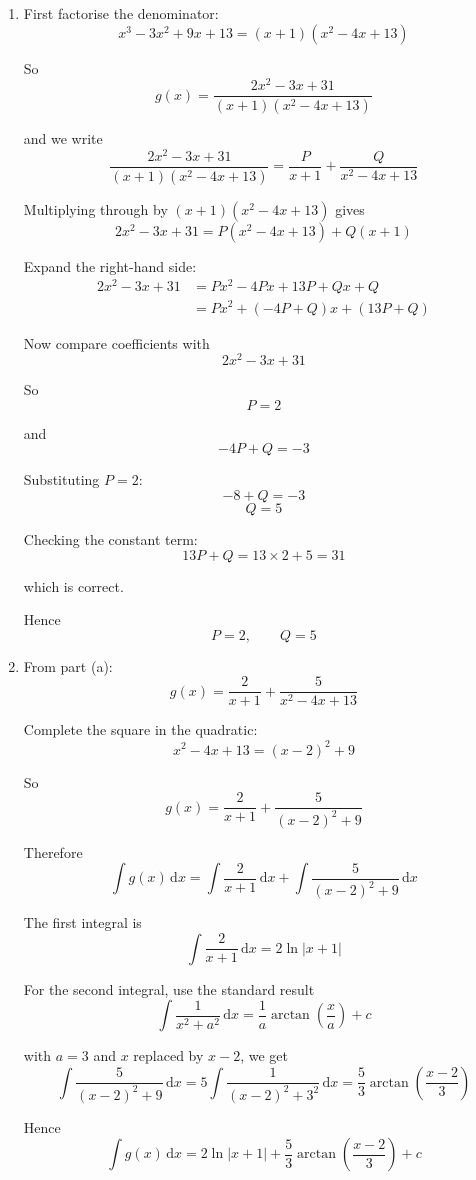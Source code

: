 \documentclass[leqno]{article}
\begin{document}
\begin{enumerate}[
  label=\textbf{\arabic*.},
  leftmargin=*,
  topsep=0pt,
  partopsep=0pt,
  parsep=0pt
]
\vspace*{10pt}

\begin{djsSolution}
\begin{enumerate}[label=\textbf{(\alph*)}]
  \item First factorise the denominator:
\[
x^3-3x^2+9x+13=(x+1)(x^2-4x+13)
\]

So
\[
g(x)=\frac{2x^2-3x+31}{(x+1)(x^2-4x+13)}
\]

and we write
\[
\frac{2x^2-3x+31}{(x+1)(x^2-4x+13)}
=\frac{P}{x+1}+\frac{Q}{x^2-4x+13}
\]

Multiplying through by $(x+1)(x^2-4x+13)$ gives
\[
2x^2-3x+31=P(x^2-4x+13)+Q(x+1)
\]

Expand the right-hand side:
\begin{align*}
2x^2-3x+31&=Px^2-4Px+13P+Qx+Q\\
&=Px^2+(-4P+Q)x+(13P+Q)
\end{align*}

Now compare coefficients with
\[
2x^2-3x+31
\]

So
\[
P=2
\]

and
\[
-4P+Q=-3
\]

Substituting $P=2$:
\[
-8+Q=-3
\]
\[
Q=5
\]

Checking the constant term:
\[
13P+Q=13\times 2+5=31
\]

which is correct.

Hence
\[
P=2,\qquad Q=5
\]

  \item From part (a):
\[
g(x)=\frac{2}{x+1}+\frac{5}{x^2-4x+13}
\]

Complete the square in the quadratic:
\[
x^2-4x+13=(x-2)^2+9
\]

So
\[
g(x)=\frac{2}{x+1}+\frac{5}{(x-2)^2+9}
\]

Therefore
\[
\int g(x)\,\mathrm{d}x=\int \frac{2}{x+1}\,\mathrm{d}x+\int \frac{5}{(x-2)^2+9}\,\mathrm{d}x
\]

The first integral is
\[
\int \frac{2}{x+1}\,\mathrm{d}x=2\ln|x+1|
\]

For the second integral, use the standard result
\[
\int \frac{1}{x^2+a^2}\,\mathrm{d}x=\frac{1}{a}\arctan\left(\frac{x}{a}\right)+c
\]

with $a=3$ and $x$ replaced by $x-2$, we get
\[
\int \frac{5}{(x-2)^2+9}\,\mathrm{d}x
=5\int \frac{1}{(x-2)^2+3^2}\,\mathrm{d}x
=\frac{5}{3}\arctan\left(\frac{x-2}{3}\right)
\]

Hence
\[
\int g(x)\,\mathrm{d}x
=2\ln|x+1|+\frac{5}{3}\arctan\left(\frac{x-2}{3}\right)+c
\]


\end{enumerate}
\end{djsSolution}
\end{enumerate}
\end{document}
